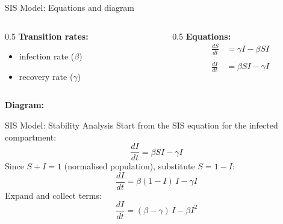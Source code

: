 \begin{frame}{SIS Model: Equations and diagram}
\begin{columns}[t]
\begin{column}{0.5\textwidth}
 \textbf{Transition rates:}
    \begin{itemize}
        \item infection rate ($\beta$) 
        \item  recovery rate ($\gamma$)
    \end{itemize}
        
    \end{column}
    \begin{column}{0.5\textwidth}
    \textbf{Equations:}
          \begin{align*}
            \frac{dS}{dt} &= \gamma I - \beta S I \\
            \\
            \frac{dI}{dt} &= \beta S I - \gamma I
          \end{align*}
    \end{column}
\end{columns}


\vfill
\textbf{Diagram:}
  \begin{center}
  \end{center}
\end{frame}

\begin{frame}{SIS Model: Stability Analysis}
\small
Start from the SIS equation for the infected compartment:
  \[
    \frac{dI}{dt} = \beta S I - \gamma I
  \]
  \pause
Since $S + I = 1$ (normalised population), substitute $S = 1 - I$:
  \[
    \frac{dI}{dt} = \beta (1-I)\, I - \gamma I
  \]
  \pause
Expand and collect terms:
  \[
    \frac{dI}{dt} = (\beta - \gamma)\, I - \beta I^2
  \]
\end{frame}

